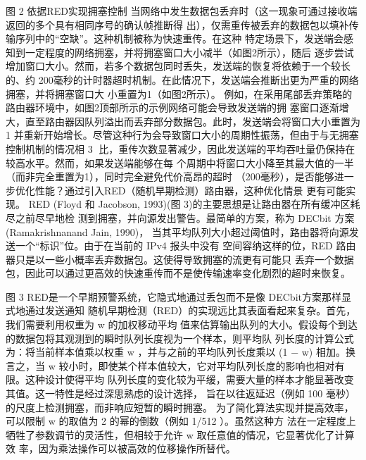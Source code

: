                  图 2 依据RED实现拥塞控制
  当网络中发生数据包丢弃时（这一现象可通过接收端返回的多个具有相同序号的确认帧推断得
出），仅需重传被丢弃的数据包以填补传输序列中的“空缺”。这种机制被称为快速重传。在这种
特定场景下，发送端会感知到一定程度的网络拥塞，并将拥塞窗口大小减半（如图2所示），随后
逐步尝试增加窗口大小。然而，若多个数据包同时丢失，发送端的恢复将依赖于一个较长的、约
200毫秒的计时器超时机制。在此情况下，发送端会推断出更为严重的网络拥塞，并将拥塞窗口大
小重置为1（如图2所示）。
  例如，在采用尾部丢弃策略的路由器环境中，如图2顶部所示的示例网络可能会导致发送端的拥
塞窗口逐渐增大，直至路由器因队列溢出而丢弃部分数据包。此时，发送端会将窗口大小重置为1
并重新开始增长。尽管这种行为会导致窗口大小的周期性振荡，但由于与无拥塞控制机制的情况相
                                                   3
比，重传次数显著减少，因此发送端的平均吞吐量仍保持在较高水平。然而，如果发送端能够在每
个周期中将窗口大小降至其最大值的一半（而非完全重置为1），同时完全避免代价高昂的超时
（200毫秒），是否能够进一步优化性能？通过引入RED（随机早期检测）路由器，这种优化情景
更有可能实现。
  RED (Floyd 和 Jacobson, 1993)(图 3)的主要思想是让路由器在所有缓冲区耗尽之前尽早地检
测到拥塞，并向源发出警告。最简单的方案，称为 DECbit 方案(Ramakrishnanand Jain, 1990)，
当其平均队列大小超过阈值时，路由器将向源发送一个“标识”位。由于在当前的 IPv4 报头中没有
空间容纳这样的位，RED 路由器只是以一些小概率丢弃数据包。这使得导致拥塞的流更有可能只
丢弃一个数据包，因此可以通过更高效的快速重传而不是使传输速率变化剧烈的超时来恢复。




图 3 RED是一个早期预警系统，它隐式地通过丢包而不是像 DECbit方案那样显式地通过发送通知
随机早期检测（RED）的实现远比其表面看起来复杂。首先，我们需要利用权重为 w 的加权移动平均
值来估算输出队列的大小。假设每个到达的数据包将其观测到的瞬时队列长度视为一个样本，则平均队
列长度的计算公式为：将当前样本值乘以权重 w ，并与之前的平均队列长度乘以 (1 − w) 相加。换
言之，当 w 较小时，即使某个样本值较大，它对平均队列长度的影响也相对有限。这种设计使得平均
队列长度的变化较为平缓，需要大量的样本才能显著改变其值。这一特性是经过深思熟虑的设计选择，
旨在以往返延迟（例如 100 毫秒）的尺度上检测拥塞，而非响应短暂的瞬时拥塞。
为了简化算法实现并提高效率，可以限制 w 的取值为 2 的幂的倒数（例如 1/512 ）。虽然这种方
法在一定程度上牺牲了参数调节的灵活性，但相较于允许 w 取任意值的情况，它显著优化了计算效
率，因为乘法操作可以被高效的位移操作所替代。




